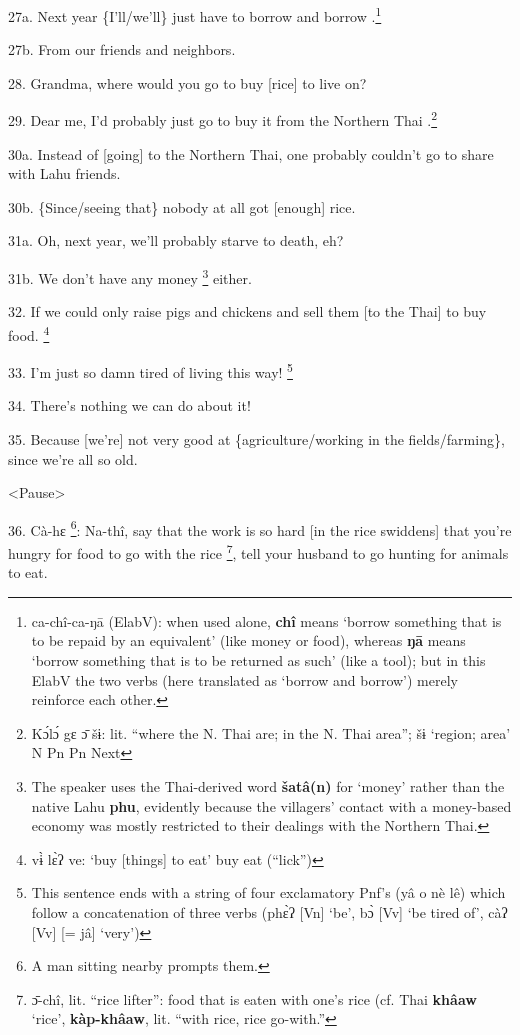 27a. Next year \{I'll/we'll\} just have to borrow and borrow .\footnote{ca-chî-ca-ŋā (ElabV): when used alone, \textbf{chî} means `borrow something that is to be repaid by an equivalent' (like money or food), whereas \textbf{ŋā }means `borrow something that is to be returned as such' (like a tool); but in this ElabV the two verbs (here translated as `borrow and borrow') merely reinforce each other.}

27b. From our friends and neighbors.

28. Grandma, where would you go to buy [rice] to live on?

29. Dear me, I'd probably just go to buy it from the Northern Thai .\footnote{Kɔ́lɔ́ gɛ ɔ̄ šɨ: lit. ``where the N. Thai are; in the N. Thai area''; šɨ `region; area'  N Pn   Pn  Next}

30a. Instead of [going] to the Northern Thai, one probably couldn't go to share
with Lahu friends.

30b. \{Since/seeing that\} nobody at all got [enough] rice.

31a. Oh, next year, we'll probably starve to death, eh?

31b. We don't have any money \footnote{The speaker uses the Thai-derived word \textbf{šatâ(n)} for `money' rather than the native Lahu \textbf{phu}, evidently because the villagers' contact with a money-based economy was mostly restricted to their dealings with the Northern Thai.} either.

32. If we could only raise pigs and chickens and sell them [to the Thai] to buy
food. \footnote{vɨ̀ lɛ̀ʔ ve: `buy [things] to eat'  buy eat (``lick'')}

33. I'm just so damn tired of living this way! \footnote{This sentence ends with a string of four exclamatory Pnf's (yâ o nè lê) which follow a concatenation of three verbs (phɛ̀ʔ [Vn] `be', bɔ̀ [Vv] `be tired of', càʔ [Vv] [= jâ] `very')}

34. There's nothing we can do about it!

35. Because [we're] not very good at \{agriculture/working in the fields/farming\},
since we're all so old.

<Pause>

36. Cà-hɛ \footnote{A man sitting nearby prompts them.}: Na-thî, say that the work is so hard [in the rice swiddens]
that you're hungry for food to go with the rice \footnote{ɔ̄-chî, lit. ``rice lifter'': food that is eaten with one's rice (cf. Thai \textbf{khâaw} `rice', \textbf{kàp-khâaw}, lit. ``with rice, rice go-with.''}, tell your husband to go hunting
for animals to eat.

